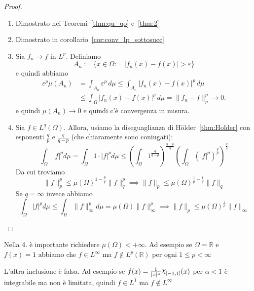 \begin{proof}
\begin{enumerate}[label = \arabic*.]
    \item Dimostrato nei Teoremi~\ref{thm:qu_qo} e~\ref{thm:2}
    \item Dimostrato in corollario~\ref{cor:conv_lp_sottosucc}
    \item Sia \(f_n \rightarrow f\) in \(L^p\). Definiamo
        \[A_n := \{x \in \Omega: \quad |f_n(x) - f(x)| > \varepsilon\}\]
        e quindi abbiamo
        \[
            \begin{aligned}
                \varepsilon^p \mu(A_n)
                &= \int_{A_n} \varepsilon^p \, d\mu
                \le \int_{A_n} |f_n(x) - f(x)|^p \, d\mu \\
                &\le \int_{\Omega} |f_n(x) - f(x)|^p \, d\mu
                = \|f_n - f\|_p^p \to 0.
            \end{aligned}
            \]
        e quindi \(\mu(A_n) \rightarrow 0\) e quindi c'è convergenza in misura.  
    \item Sia \(f \in L^{q}{(\Omega)}\). Allora, usiamo la
        diseguaglianza di Hölder~\ref{thm:Holder} con esponenti \(\frac{q}{p}\) e \(\frac{q}{q-p}\) (che chiaramente sono coniugati):
    \[
        \int_{\Omega} \left| f \right|^{p} d\mu = \int_{\Omega} 1 \cdot
        |f|^{p}d\mu \le {\left( \int_{\Omega} 1^{\frac{q}{q-p}}
        \right)}^{\frac{q-p}{q}} {\left( \int_{\Omega} {\left( |f|^{p}
        \right)}^{\frac{q}{p}}  \right)}^{\frac{p}{q}}
    \]
    Da cui troviamo 
    \[
    \|f\|_p^{p} \le {\mu(\Omega)}^{1 - \frac{p}{q}} \|f\|_q^{p} \implies
    \|f\|_p \le {\mu(\Omega)}^{\frac{1}{p} - \frac{1}{q}} \|f\|_q
    \]
    Se \(q = \infty\) invece abbiamo 
    \[
        \int_\Omega |f|^{p} d\mu \le \int_{\Omega} \|f\|^{p}_{\infty} d\mu =
        \mu(\Omega) \|f\|_{\infty}^{p} \implies \|f\|_p \le
        {\mu(\Omega)}^{\frac{1}{p}} \|f\|_{\infty}
    \]
    \end{enumerate}
\end{proof}
\begin{example}
    Nella 4. è importante richiedere \(\mu{(\Omega )} < +\infty\). Ad esempio se
    \(\Omega = \mathbb{R}\) e \(f{(x)} = 1\) abbiamo che \(f \in L^{\infty}\) ma
    \(f \not\in L^{p}{(\mathbb{R})}\) per ogni \(1 \le p < \infty\) 
\end{example}
\begin{example}
    L'altra inclusione è falsa. Ad esempio se \(f{(x)} =
    \frac{1}{|x|^{\alpha}} \rchi_{[-1,1]}{(x)} \) per \(\alpha < 1\) è
    integrabile ma non è limitata, quindi \(f \in L^{1}\) ma \(f\not\in L^{\infty}\) 
\end{example}
